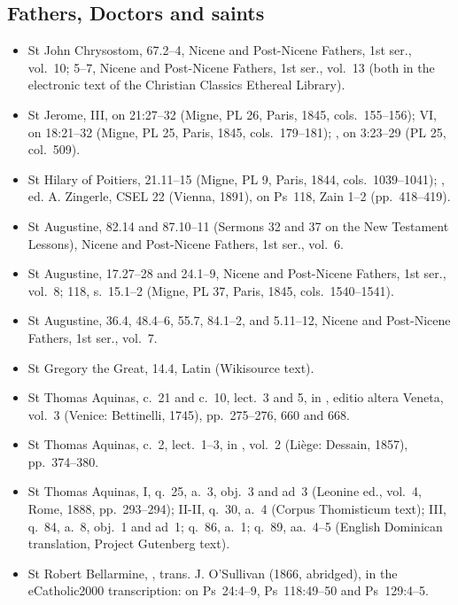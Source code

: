 {\subsection*{Fathers, Doctors and saints}
\begin{itemize}[itemsep=0pt,topsep=.25em]
\item St John Chrysostom,  67.2--4, Nicene and Post-Nicene Fathers, 1st ser., vol.~10;  5--7, Nicene and Post-Nicene Fathers, 1st ser., vol.~13 (both in the electronic text of the Christian Classics Ethereal Library).
\item St Jerome,  III, on 21:27--32 (Migne, PL 26, Paris, 1845, cols.~155--156);  VI, on 18:21--32 (Migne, PL 25, Paris, 1845, cols.~179--181); , on 3:23--29 (PL 25, col.~509).
\item St Hilary of Poitiers,  21.11--15 (Migne, PL 9, Paris, 1844, cols.~1039--1041); , ed. A. Zingerle, CSEL 22 (Vienna, 1891), on Ps~118, Zain 1--2 (pp.~418--419).
\item St Augustine,  82.14 and 87.10--11 (Sermons 32 and 37 on the New Testament Lessons), Nicene and Post-Nicene Fathers, 1st ser., vol.~6.
\item St Augustine,  17.27--28 and 24.1--9, Nicene and Post-Nicene Fathers, 1st ser., vol.~8; 118, s.~15.1--2 (Migne, PL 37, Paris, 1845, cols.~1540--1541).
\item St Augustine,  36.4, 48.4--6, 55.7, 84.1--2, and  5.11--12, Nicene and Post-Nicene Fathers, 1st ser., vol.~7.
\item St Gregory the Great,  14.4, Latin (Wikisource text).
\item St Thomas Aquinas,  c.~21 and  c.~10, lect.~3 and 5, in , editio altera Veneta, vol.~3 (Venice: Bettinelli, 1745), pp.~275--276, 660 and 668.
\item St Thomas Aquinas,  c.~2, lect.~1--3, in , vol.~2 (Li\`ege: Dessain, 1857), pp.~374--380.
\item St Thomas Aquinas,  I, q.~25, a.~3, obj.~3 and ad~3 (Leonine ed., vol.~4, Rome, 1888, pp.~293--294); II-II, q.~30, a.~4 (Corpus Thomisticum text); III, q.~84, a.~8, obj.~1 and ad~1; q.~86, a.~1; q.~89, aa.~4--5 (English Dominican translation, Project Gutenberg text).
\item St Robert Bellarmine, , trans. J. O'Sullivan (1866, abridged), in the eCatholic2000 transcription: on Ps~24:4--9, Ps~118:49--50 and Ps~129:4--5.
\end{itemize}

}
